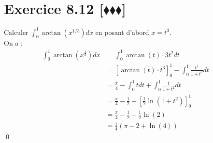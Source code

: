 \documentclass[10pt]{article}
\begin{document}
\section*{Exercice 8.12 [$\blacklozenge\blacklozenge\blacklozenge$]}
\begin{tcolorbox}[enhanced, width=7in, center, size=fbox, fontupper=\large, drop shadow southwest]
    Calculer $\int_0^1{\arctan(x^{1/3})dx}$ en posant d'abord $x=t^3$.\\
    On a :
    \begin{align*}
        \int_0^1{\arctan(x^{\frac{1}{3}})dx}&=\int_0^1{\arctan(t)\cdot3t^2dt}\\
        &=\left[\arctan(t)\cdot t^3\right]_0^1 - \int_0^1{\frac{t^3}{1+t^2} dt}\\
        &=\frac{\pi}{4} - \int_0^1{tdt}+\int_0^1{\frac{t}{1+t^2}dt}\\
        &=\frac{\pi}{4} - \frac{1}{2} + \left[\frac{1}{2}\ln(1+t^2)\right]_0^1\\
        &=\frac{\pi}{4} - \frac{1}{2} + \frac{1}{2}\ln(2)\\
        &=\frac{1}{4}\left(\pi - 2 + \ln(4)\right)
    \end{align*}
    \qed
\end{tcolorbox}

\end{document}
